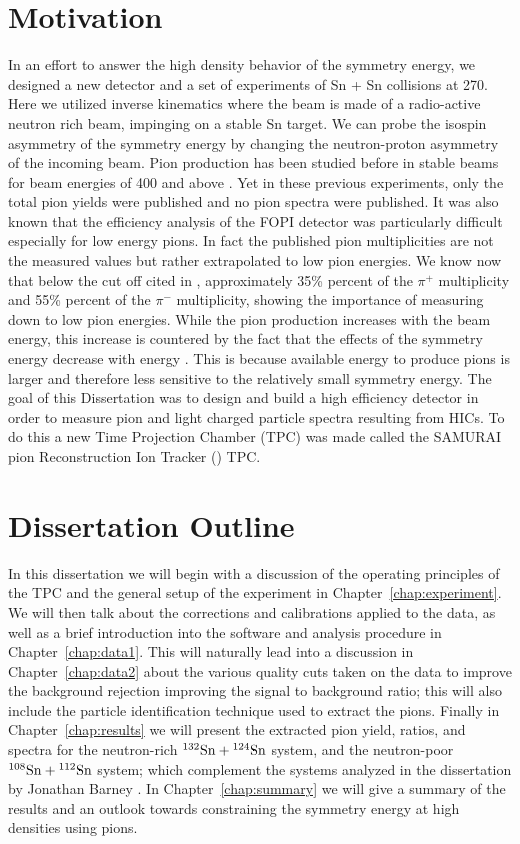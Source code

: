 \section{Motivation}
In an effort to answer the high density behavior of the symmetry energy, we designed a new detector and a set of experiments of Sn + Sn collisions at \SI{270}{\MeVA}. Here we utilized inverse kinematics where the beam is made of a radio-active neutron rich beam, impinging on a stable Sn target. We can probe the isospin asymmetry of the symmetry energy by changing the neutron-proton asymmetry of the incoming beam. Pion production has been studied before in stable beams for beam energies of \SI{400}{\MeVA} and above \cite{fopi}. Yet in these previous experiments, only the total pion yields were published and no pion spectra were published. It was also known that the efficiency analysis of the FOPI detector was particularly difficult especially for low energy pions. In fact the published pion multiplicities are not the measured values but rather extrapolated to low pion energies. We know now that below the cut off cited in \cite{fopi}, approximately 35\% percent of the $\pi^+$ multiplicity and 55\% percent of the $\pi^-$ multiplicity, showing the importance of measuring down to low pion energies. While the pion production increases with the beam energy, this increase is countered by the fact that the effects of the symmetry energy decrease with energy \cite{fopi}. This is because available energy to produce pions is larger and therefore less sensitive to the relatively small symmetry energy.  The goal of this Dissertation was to design and build a high efficiency detector in order to measure pion and light charged particle spectra resulting from HICs. To do this a new Time Projection Chamber (TPC) was made called the SAMURAI pion Reconstruction Ion Tracker (\spirit) TPC.

\section{Dissertation Outline}
In this dissertation we will begin with a discussion of the operating principles of the \spirit TPC and the general setup of the experiment in Chapter~\ref{chap:experiment}. We will then talk about the corrections and calibrations applied to the data, as well as a brief introduction into the software and analysis procedure in Chapter~\ref{chap:data1}. This will naturally lead into a discussion in Chapter~\ref{chap:data2} about the various quality cuts taken on the data to improve the background rejection improving the signal to background ratio; this will also include the particle identification technique used to extract the pions. Finally in Chapter~\ref{chap:results} we will present the extracted pion yield, ratios, and spectra for the neutron-rich  ${}^{132}\mathrm{Sn} + {}^{124}\mathrm{Sn}$ system, and the neutron-poor ${}^{108}\mathrm{Sn} + {}^{112}\mathrm{Sn}$ system; which complement the systems analyzed in the dissertation by Jonathan Barney \cite{jon}. In Chapter~\ref{chap:summary} we will give a summary of the results and an outlook towards constraining the symmetry energy at high densities using pions. 